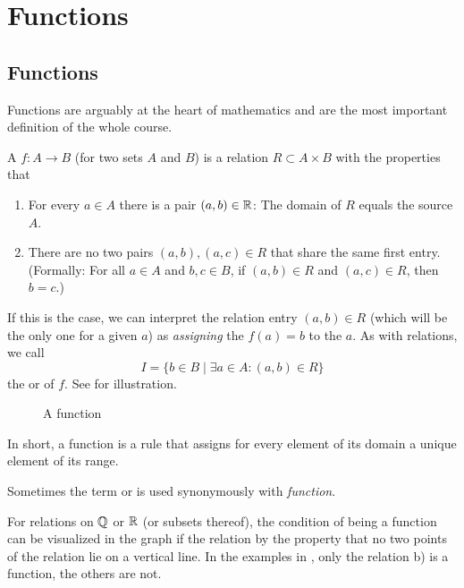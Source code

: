 \chapter{Functions}
\label{chfuns}

\section{Functions}

Functions are arguably at the heart of mathematics and are the most
important definition of the whole course.

\begin{defn}
A  $f\colon A\to B$ (for two sets $A$ and $B$) is a relation $R\subset
A\times B$ with the properties that
\begin{enumerate}
\item 
For every $a\in A$ there is a pair $(a,b)\in{\mathbb R}$: The domain of $R$ equals the source $A$.
\item
There
are no two pairs $(a,b),(a,c)\in R$ that share the same first entry.
(Formally: 
For all $a\in A$ and $b,c\in B$, if $(a,b)\in R$ and
$(a,c)\in R$, then $b=c$.)
\end{enumerate}
If this is the case, we can interpret the relation entry $(a,b)\in R$ (which
will be the only one for a given $a$) as {\em assigning} the 
$f(a)=b$ to the  $a$. As with relations, we call 
\[
I=\{b\in B\mid \exists a\in A: (a,b)\in R\}
\]
the  or  of $f$.
See  for illustration.
\end{defn}

\begin{figure}[t]
\begin{center}
\end{center}
\caption{A function}
\label{figgeneralfct}
\end{figure}

In short, a function is a rule that assigns for every element of its domain 
a unique element of its range.

Sometimes the term  or  is used synonymously
with {\em function}.

For relations on ${\mathbb Q}$ or ${\mathbb R}$ (or subsets thereof), the condition of being a
function can be
visualized in the graph if the relation by the property that no two points
of the relation lie on a vertical line. In the examples in
, only the relation b) is a function, the others
are not.
\smallskip

